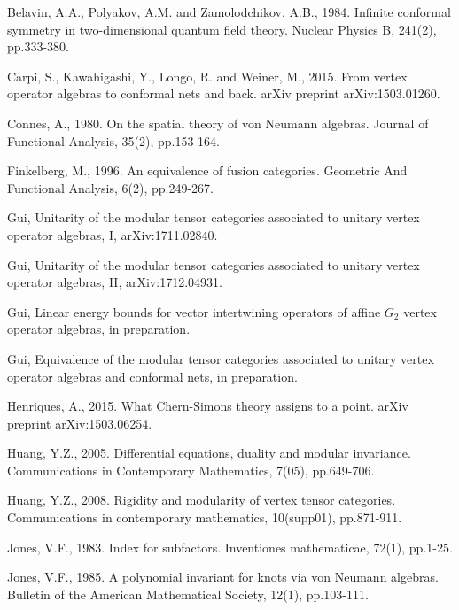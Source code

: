\documentclass[10pt]{amsart}
\theoremstyle{definition}
\theoremstyle{plain}
\begin{document}
\begin{thebibliography}{99}
\small
{}
Belavin, A.A., Polyakov, A.M. and Zamolodchikov, A.B., 1984. Infinite conformal symmetry in two-dimensional quantum field theory. Nuclear Physics B, 241(2), pp.333-380.

Carpi, S., Kawahigashi, Y., Longo, R. and Weiner, M., 2015. From vertex operator algebras to conformal nets and back. arXiv preprint arXiv:1503.01260.



Connes, A., 1980. On the spatial theory of von Neumann algebras. Journal of Functional Analysis, 35(2), pp.153-164.


Finkelberg, M., 1996. An equivalence of fusion categories. Geometric And Functional Analysis, 6(2), pp.249-267.
	
	
Gui,  Unitarity of the modular tensor categories associated to unitary vertex operator algebras, I, arXiv:1711.02840.

Gui,  Unitarity of the modular tensor categories associated to unitary vertex operator algebras, II, arXiv:1712.04931.

Gui, Linear energy bounds for vector intertwining operators of affine $G_2$ vertex operator algebras, in preparation.

Gui, Equivalence of the modular tensor categories associated to unitary vertex operator algebras and conformal nets, in preparation.

Henriques, A., 2015. What Chern-Simons theory assigns to a point. arXiv preprint arXiv:1503.06254.

Huang, Y.Z., 2005. Differential equations, duality and modular invariance. Communications in Contemporary Mathematics, 7(05), pp.649-706.

Huang, Y.Z., 2008. Rigidity and modularity of vertex tensor categories. Communications in contemporary mathematics, 10(supp01), pp.871-911.

Jones, V.F., 1983. Index for subfactors. Inventiones mathematicae, 72(1), pp.1-25.

Jones, V.F., 1985. A polynomial invariant for knots via von Neumann algebras. Bulletin of the American Mathematical Society, 12(1), pp.103-111.


\end{thebibliography}
\end{document}
